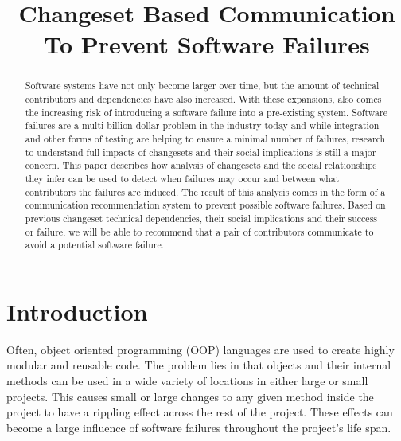 \documentclass[conference]{IEEEtran}
\begin{document}
\title{Changeset Based Communication To Prevent Software Failures}

\author{
\and
{}
\and
{}
}

\maketitle


\begin{abstract}
Software systems have not only become larger over time, but the amount of
technical contributors and dependencies have also increased. With these expansions, also comes
the increasing risk of introducing a software failure into a pre-existing system.
Software failures are a multi billion dollar problem in the industry today and while integration and
other forms of testing are helping to ensure a minimal number of failures, research to understand
full impacts of changesets and their social implications is still a major concern. This paper describes
how analysis of changesets and the social relationships they infer can be used to detect when failures 
may occur and between what contributors the failures are induced. The result of this
analysis comes in the form of a communication recommendation system to prevent possible software 
failures. Based on previous changeset technical dependencies, their social implications and their 
success or failure,  we will be able to recommend that a pair of contributors communicate
to avoid a potential software failure.
\end{abstract}


\section{Introduction}
Often, object oriented programming (OOP) languages are used to create highly modular and 
reusable code. The problem lies in that objects and their internal methods can be used in a wide
variety of locations in either large or small projects. This causes small or large changes to any 
given method inside the project to have a rippling effect across the rest of the project. These 
effects can become a large influence of software failures throughout the project's life span.
\end{document}
